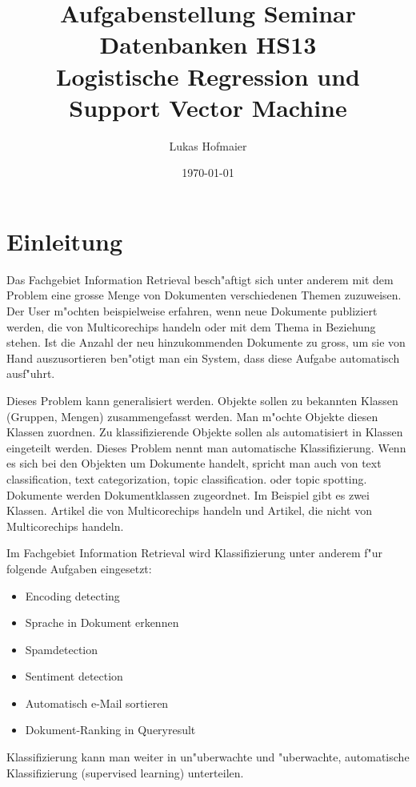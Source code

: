 \documentclass[11pt]{article}
\title{Aufgabenstellung Seminar Datenbanken HS13 \\ Logistische Regression und Support Vector Machine}
\author{Lukas Hofmaier}
\date{\today}
\begin{document}
\maketitle

\setcounter{tocdepth}{3}

\vspace*{1cm}
\section{Einleitung}
\label{sec-1}

Das Fachgebiet Information Retrieval besch"aftigt sich unter anderem mit dem Problem eine grosse Menge von Dokumenten verschiedenen Themen zuzuweisen. Der User m"ochten beispielweise erfahren, wenn neue Dokumente publiziert werden, die von Multicorechips handeln oder mit dem Thema in Beziehung stehen. Ist die Anzahl der neu hinzukommenden Dokumente zu gross, um sie von Hand auszusortieren ben"otigt man ein System, dass diese Aufgabe automatisch ausf"uhrt.

Dieses Problem kann generalisiert werden. Objekte sollen zu bekannten Klassen (Gruppen, Mengen) zusammengefasst werden. Man m"ochte Objekte diesen Klassen zuordnen. Zu klassifizierende Objekte sollen als automatisiert in Klassen eingeteilt werden. Dieses Problem nennt man automatische Klassifizierung. Wenn es sich bei den Objekten um Dokumente handelt, spricht man auch von text classification, text categorization, topic classification. oder topic spotting. Dokumente werden Dokumentklassen zugeordnet. Im Beispiel gibt es zwei Klassen. Artikel die von Multicorechips handeln und Artikel, die nicht von Multicorechips handeln.

Im Fachgebiet Information Retrieval wird Klassifizierung unter anderem f"ur folgende Aufgaben eingesetzt:

\begin{itemize}
\item Encoding detecting
\item Sprache in Dokument erkennen
\item Spamdetection
\item Sentiment detection
\item Automatisch e-Mail sortieren
\item Dokument-Ranking in Queryresult
\end{itemize}

Klassifizierung kann man weiter in un"uberwachte und "uberwachte, automatische Klassifizierung (supervised learning) unterteilen. 
\end{document}
